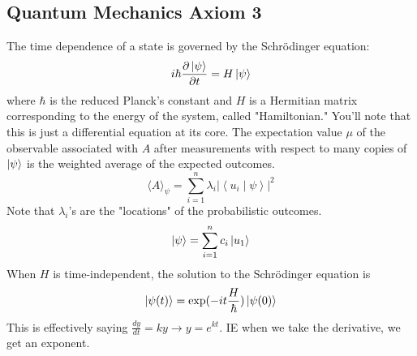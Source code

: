 \documentclass[12pt]{article}
\theoremstyle{plain}
\theoremstyle{nonumberplain}
\theoremstyle{plain}
\theoremstyle{nonumberplain}
\newcommand\1{{\bf 1}}
\newcommand{\<}{\left\langle}
\renewcommand{\>}{\right\rangle}
\newcommand{\inp}[2]{\left\langle#1\mid #2\right\rangle} %
\begin{document}

\subsection{Quantum Mechanics Axiom 3}
The time dependence of a state is governed by the Schrödinger equation:
\begin{equation}
i\hbar\frac{\partial\ket{\psi}}{\partial t}=H\ket{\psi}
\end{equation}
where $\hbar$ is the reduced Planck's constant and $H$ is a Hermitian matrix corresponding to the energy of the system, called "Hamiltonian." You'll note that this is just a differential equation at its core. The expectation value $\mu$ of the observable associated with $A$ after measurements with respect to many copies of $\ket{\psi}$ is the weighted average of the expected outcomes.
\begin{equation}
\langle A\rangle_\psi=\sum^n_{i=1}\lambda_i\vert\inp{u_i}{\psi}\vert^2
\end{equation}
Note that $\lambda_i$'s are the "locations" of the probabilistic outcomes.
\begin{equation}
\ket{\psi}=\sum^n_{i=1}c_i\ket{u_1}
\end{equation}
When $H$ is time-independent, the solution to the Schrödinger equation is
\begin{equation}
\ket{\psi(t)}=\text{exp}(-it\frac{H}{\hbar})\ket{\psi(0)}
\end{equation}
This is effectively saying $\frac{dy}{dt}=ky\longrightarrow y=e^{kt}$. IE when we take the derivative, we get an exponent.
\end{document}
